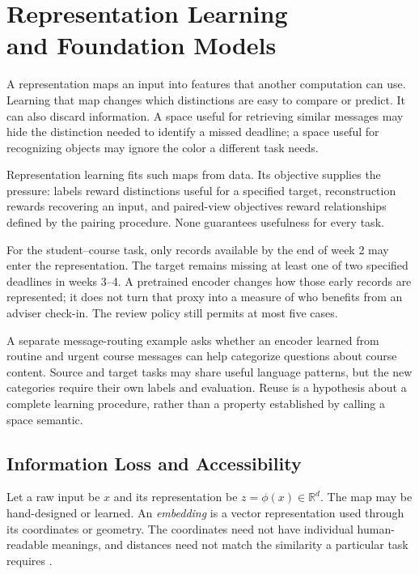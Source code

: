 \begingroup
\raggedbottom
{}
\chapter[Representation Learning and Foundation Models]{Representation Learning\\and Foundation Models}
\label{ch:representation-foundation-models}

A representation maps an input into features that another computation can use. Learning that map changes which distinctions are easy to compare or predict. It can also discard information. A space useful for retrieving similar messages may hide the distinction needed to identify a missed deadline; a space useful for recognizing objects may ignore the color a different task needs.

Representation learning fits such maps from data. Its objective supplies the pressure: labels reward distinctions useful for a specified target, reconstruction rewards recovering an input, and paired-view objectives reward relationships defined by the pairing procedure. None guarantees usefulness for every task.

For the student--course task, only records available by the end of week 2 may enter the representation. The target remains missing at least one of two specified deadlines in weeks 3--4. A pretrained encoder changes how those early records are represented; it does not turn that proxy into a measure of who benefits from an adviser check-in. The review policy still permits at most five cases.

A separate message-routing example asks whether an encoder learned from routine and urgent course messages can help categorize questions about course content. Source and target tasks may share useful language patterns, but the new categories require their own labels and evaluation. Reuse is a hypothesis about a complete learning procedure, rather than a property established by calling a space semantic.

\section{Information Loss and Accessibility}

Let a raw input be $x$ and its representation be $z=\phi(x)\in\mathbb R^d$. The map may be hand-designed or learned. An \emph{embedding} is a vector representation used through its coordinates or geometry. The coordinates need not have individual human-readable meanings, and distances need not match the similarity a particular task requires \citep{bengio2013rep}.

